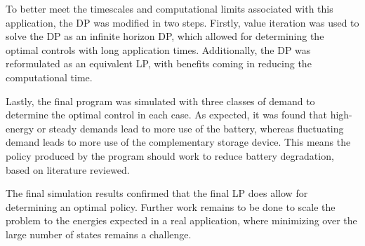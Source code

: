 \documentclass[conference]{IEEEtran}
\begin{document}
To better meet the timescales and computational limits associated with this application, the DP was modified in two steps. Firstly, value iteration was used to solve the DP as an infinite horizon DP, which allowed for determining the optimal controls with long application times. Additionally, the DP was reformulated as an equivalent LP, with benefits coming in reducing the computational time. %

Lastly, the final program was simulated with three classes of demand to determine the optimal control in each case. As expected, it was found that high-energy or steady demands lead to more use of the battery, whereas fluctuating demand leads to more use of the complementary storage device. This means the policy produced by the program should work to reduce battery degradation, based on literature reviewed.

The final simulation results confirmed that the final LP does allow for determining an optimal policy. Further work remains to be done to scale the problem to the energies expected in a real application, where minimizing over the large number of states remains a challenge.

\printbibliography
\end{document}
